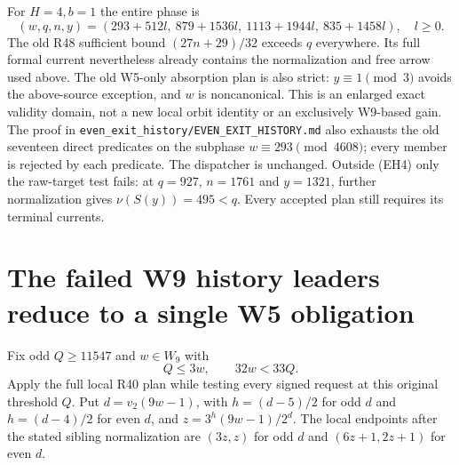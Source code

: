 \documentclass[11pt]{article}
\begin{document}
For $H=4,b=1$ the entire phase is
\[
 (w,q,n,y)=(293+512l,\ 879+1536l,\ 1113+1944l,\ 835+1458l),
 \quad l\ge0.
 \tag{EH7}
\]
The old R48 sufficient bound $(27n+29)/32$ exceeds $q$ everywhere.
Its full formal current nevertheless already contains the normalization
and free arrow used above. The old W5-only absorption plan is also strict:
$y\equiv1\pmod3$ avoids the above-source exception, and $w$ is
noncanonical. This is an enlarged exact validity domain, not a new local
orbit identity or an exclusively W9-based gain. The proof in
\texttt{even\_exit\_history/EVEN\_EXIT\_HISTORY.md} also exhausts the
old seventeen direct predicates on the subphase $w\equiv293\pmod{4608}$;
every member is rejected by each predicate. The dispatcher is unchanged.
Outside (EH4) only the raw-target test fails: at $q=927$, $n=1761$ and
$y=1321$, further normalization gives $\nu(S(y))=495<q$.
Every accepted plan still requires its terminal currents.

\section{The failed W9 history leaders reduce to a single W5 obligation}
Fix odd $Q\ge11547$ and $w\in W_9$ with
\[
 Q\le3w,\qquad32w<33Q.
 \tag{WR1}
\]
Apply the full local R40 plan while testing every signed request at this
original threshold $Q$. Put $d=v_2(9w-1)$, with
$h=(d-5)/2$ for odd $d$ and $h=(d-4)/2$ for even $d$, and
$z=3^h(9w-1)/2^d$. The local endpoints after the stated sibling
normalization are $(3z,z)$ for odd $d$ and $(6z+1,2z+1)$ for even $d$.
\end{document}
